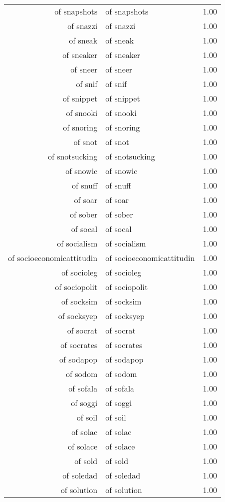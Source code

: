 \begin{table}[ht]
\begin{tabular}{rlr}
  of snapshots & of snapshots & 1.00 \\ 
  of snazzi & of snazzi & 1.00 \\ 
  of sneak & of sneak & 1.00 \\ 
  of sneaker & of sneaker & 1.00 \\ 
  of sneer & of sneer & 1.00 \\ 
  of snif & of snif & 1.00 \\ 
  of snippet & of snippet & 1.00 \\ 
  of snooki & of snooki & 1.00 \\ 
  of snoring & of snoring & 1.00 \\ 
  of snot & of snot & 1.00 \\ 
  of snotsucking & of snotsucking & 1.00 \\ 
  of snowic & of snowic & 1.00 \\ 
  of snuff & of snuff & 1.00 \\ 
  of soar & of soar & 1.00 \\ 
  of sober & of sober & 1.00 \\ 
  of socal & of socal & 1.00 \\ 
  of socialism & of socialism & 1.00 \\ 
  of socioeconomicattitudin & of socioeconomicattitudin & 1.00 \\ 
  of socioleg & of socioleg & 1.00 \\ 
  of sociopolit & of sociopolit & 1.00 \\ 
  of socksim & of socksim & 1.00 \\ 
  of socksyep & of socksyep & 1.00 \\ 
  of socrat & of socrat & 1.00 \\ 
  of socrates & of socrates & 1.00 \\ 
  of sodapop & of sodapop & 1.00 \\ 
  of sodom & of sodom & 1.00 \\ 
  of sofala & of sofala & 1.00 \\ 
  of soggi & of soggi & 1.00 \\ 
  of soil & of soil & 1.00 \\ 
  of solac & of solac & 1.00 \\ 
  of solace & of solace & 1.00 \\ 
  of sold & of sold & 1.00 \\ 
  of soledad & of soledad & 1.00 \\ 
  of solution & of solution & 1.00 \\ 

\end{tabular}
\end{table}
